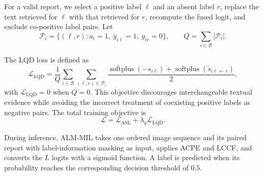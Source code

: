 
For a valid report, we select a positive label $\ell$ and an absent label $r$,
replace the text retrieved for $\ell$ with that retrieved for $r$, recompute
the fused logit, and exclude co-positive label pairs.  Let
\begin{equation}
\mathcal{P}_i
=
\{(\ell,r):a_i=1,\ y_{i\ell}=1,\ y_{ir}=0\},
\qquad
Q=\sum_{i\in\mathcal{B}}|\mathcal{P}_i|.
\label{eq:lqd_pairs_new}
\end{equation}


The LQD loss is defined as
\begin{equation}
\mathcal{L}_{\mathrm{LQD}}
=
\frac{1}{Q}
\sum_{i\in\mathcal{B}}
\sum_{(\ell,r)\in\mathcal{P}_i}
\frac{
\operatorname{softplus}(-s_{i\ell})
+
\operatorname{softplus}(\widetilde{s}_{i\ell\leftarrow r})
}{2},
\label{eq:lqd_new}
\end{equation}
with $\mathcal{L}_{\mathrm{LQD}}=0$ when $Q=0$.  This objective discourages
interchangeable textual evidence while avoiding the incorrect treatment of
coexisting positive labels as negative pairs.  The total training objective is
\begin{equation}
\mathcal{L}
=
\mathcal{L}_{\mathrm{ASL}}
+
\lambda_q\mathcal{L}_{\mathrm{LQD}}.
\label{eq:total_loss_new}
\end{equation}


During inference, ALM-MIL takes one ordered image sequence and its paired
report with label-information masking as input, applies ACPE and LCCF, and
converts the $L$ logits with a sigmoid function.  A label is predicted when
its probability reaches the corresponding decision threshold of $0.5$.

